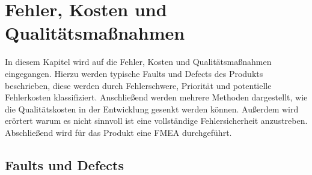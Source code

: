 \section{Fehler, Kosten und Qualitätsmaßnahmen}

In diesem Kapitel wird auf die Fehler, Kosten und Qualitätsmaßnahmen eingegangen.
Hierzu werden typische Faults und Defects des Produkts beschrieben, diese werden durch Fehlerschwere, Priorität und potentielle Fehlerkosten klassifiziert. 
Anschließend werden mehrere Methoden dargestellt, wie die Qualitätskosten in der Entwicklung gesenkt werden können.
Außerdem wird erörtert warum es nicht sinnvoll ist eine vollständige Fehlersicherheit anzustreben.
Abschließend wird für das Produkt eine \ac{FMEA} durchgeführt.

\subsection{Faults und Defects}

